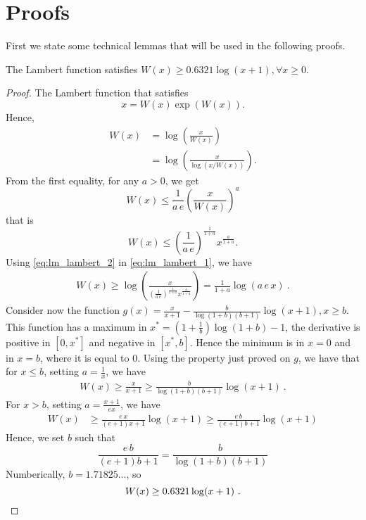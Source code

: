 \section{Proofs}

First we state some technical lemmas that will be used in the following proofs.

\begin{lemma}
The Lambert function satisfies $W(x) \geq 0.6321 \log(x+1), \forall x\geq0$.
\end{lemma}
\begin{proof}
The Lambert function that satisfies
\[
x=W(x) \exp \left(W(x)\right).
\]
Hence,
\begin{align}
W(x) &= \log\left(\frac{x}{W(x)}\right) \label{eq:lm_lambert_1} \\
&= \log\left(\frac{x}{\log(x/W(x))}\right). \label{eq:lm_lambert_1b}
\end{align}
From the first equality, for any $a>0$, we get
\[
W(x) \leq \frac{1}{a\, e}\left(\frac{x}{W(x)}\right)^a
\]
that is
\begin{equation}
\label{eq:lm_lambert_2}
W(x) \leq \left(\frac{1}{a\, e}\right)^\frac{1}{1+a} x^\frac{a}{1+a}.
\end{equation}
Using \eqref{eq:lm_lambert_2} in \eqref{eq:lm_lambert_1}, we have
\begin{align*}
W(x) 
\geq \log\left(\frac{x}{\left(\frac{1}{a\, e}\right)^\frac{1}{1+a} x^\frac{a}{1+a}}\right) 
= \frac{1}{1+a}\log\left(a \, e\, x\right)~.
\end{align*}
Consider now the function $g(x)=\frac{x}{x+1} - \frac{b}{\log(1+b) (b+1)} \log(x+1), x\geq b$. This function has a maximum in $x^*=(1+\frac{1}{b}) \log(1+b)-1$, the derivative is positive in $[0,x^*]$ and negative in $[x^*,b]$. Hence the minimum is in $x=0$ and in $x=b$, where it is equal to $0$.
Using the property just proved on $g$, we have that for $x\leq b$, setting $a=\frac{1}{x}$, we have
\begin{align*}
W(x) 
\geq \frac{x}{x+1} \geq \frac{b}{\log(1+b) (b+1)} \log(x+1)~.
\end{align*}
For $x>b$, setting $a=\frac{x+1}{e x}$, we have
\begin{align}
W(x) 
&\geq \frac{e\,x}{(e+1) x + 1} \log(x+1) \geq \frac{e\,b}{(e+1) b + 1} \log(x+1)
\end{align}
Hence, we set $b$ such that 
\[
\frac{e\, b}{(e+1)b + 1} = \frac{b}{\log(1+b) (b+1)}
\]
Numberically, $b=1.71825...$, so
\[
W(x) \geq 0.6321 \log(x+1)~. \qedhere
\]
\end{proof}

